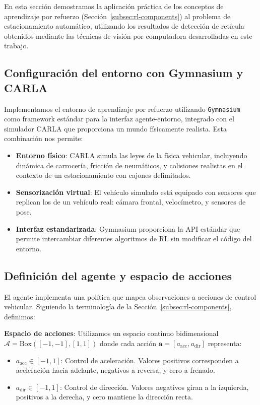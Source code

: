 
En esta sección demostramos la aplicación práctica de los conceptos de aprendizaje por refuerzo
(Sección~\ref{subsec:rl-components}) al problema de estacionamiento automático, utilizando
los resultados de detección de retícula obtenidos mediante las técnicas de visión por computadora
desarrolladas en este trabajo.

\subsection{Configuración del entorno con Gymnasium y CARLA}\label{subsec:rl-environment}

Implementamos el entorno de aprendizaje por refuerzo utilizando \texttt{Gymnasium} como framework
estándar para la interfaz agente-entorno, integrado con el simulador CARLA que proporciona
un mundo físicamente realista. Esta combinación nos permite:

\begin{itemize}
    \item \textbf{Entorno físico}: CARLA simula las leyes de la física vehicular, incluyendo
    dinámica de carrocería, fricción de neumáticos, y colisiones realistas en el contexto
    de un estacionamiento con cajones delimitados.
    
    \item \textbf{Sensorización virtual}: El vehículo simulado está equipado con sensores
    que replican los de un vehículo real: cámara frontal, velocímetro, y sensores de pose.
    
    \item \textbf{Interfaz estandarizada}: Gymnasium proporciona la API estándar que permite
    intercambiar diferentes algoritmos de RL sin modificar el código del entorno.
\end{itemize}

\subsection{Definición del agente y espacio de acciones}\label{subsec:rl-agent}

El agente implementa una política que mapea observaciones a acciones de control vehicular.
Siguiendo la terminología de la Sección~\ref{subsec:rl-components}, definimos:


\textbf{Espacio de acciones}: Utilizamos un espacio continuo bidimensional
$\mathcal{A} = \text{Box}([-1, -1], [1, 1])$ donde cada acción $\mathbf{a} = [a_{\text{acc}}, a_{\text{dir}}]$ representa:
\begin{itemize}
    \item $a_{\text{acc}} \in [-1, 1]$: Control de aceleración. Valores positivos corresponden
    a aceleración hacia adelante, negativos a reversa, y cero a frenado.
    \item $a_{\text{dir}} \in [-1, 1]$: Control de dirección. Valores negativos giran a la izquierda,
    positivos a la derecha, y cero mantiene la dirección recta.
\end{itemize}

